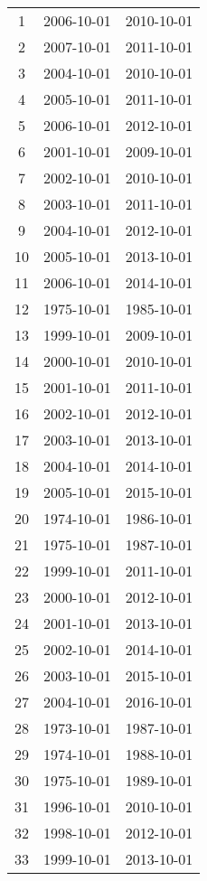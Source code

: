 % 
\begin{tabular}{ccc}
  \hline
  \hline
1 & 2006-10-01 & 2010-10-01 \\ 
  2 & 2007-10-01 & 2011-10-01 \\ 
  3 & 2004-10-01 & 2010-10-01 \\ 
  4 & 2005-10-01 & 2011-10-01 \\ 
  5 & 2006-10-01 & 2012-10-01 \\ 
  6 & 2001-10-01 & 2009-10-01 \\ 
  7 & 2002-10-01 & 2010-10-01 \\ 
  8 & 2003-10-01 & 2011-10-01 \\ 
  9 & 2004-10-01 & 2012-10-01 \\ 
  10 & 2005-10-01 & 2013-10-01 \\ 
  11 & 2006-10-01 & 2014-10-01 \\ 
  12 & 1975-10-01 & 1985-10-01 \\ 
  13 & 1999-10-01 & 2009-10-01 \\ 
  14 & 2000-10-01 & 2010-10-01 \\ 
  15 & 2001-10-01 & 2011-10-01 \\ 
  16 & 2002-10-01 & 2012-10-01 \\ 
  17 & 2003-10-01 & 2013-10-01 \\ 
  18 & 2004-10-01 & 2014-10-01 \\ 
  19 & 2005-10-01 & 2015-10-01 \\ 
  20 & 1974-10-01 & 1986-10-01 \\ 
  21 & 1975-10-01 & 1987-10-01 \\ 
  22 & 1999-10-01 & 2011-10-01 \\ 
  23 & 2000-10-01 & 2012-10-01 \\ 
  24 & 2001-10-01 & 2013-10-01 \\ 
  25 & 2002-10-01 & 2014-10-01 \\ 
  26 & 2003-10-01 & 2015-10-01 \\ 
  27 & 2004-10-01 & 2016-10-01 \\ 
  28 & 1973-10-01 & 1987-10-01 \\ 
  29 & 1974-10-01 & 1988-10-01 \\ 
  30 & 1975-10-01 & 1989-10-01 \\ 
  31 & 1996-10-01 & 2010-10-01 \\ 
  32 & 1998-10-01 & 2012-10-01 \\ 
  33 & 1999-10-01 & 2013-10-01 \\ 

\end{tabular}
